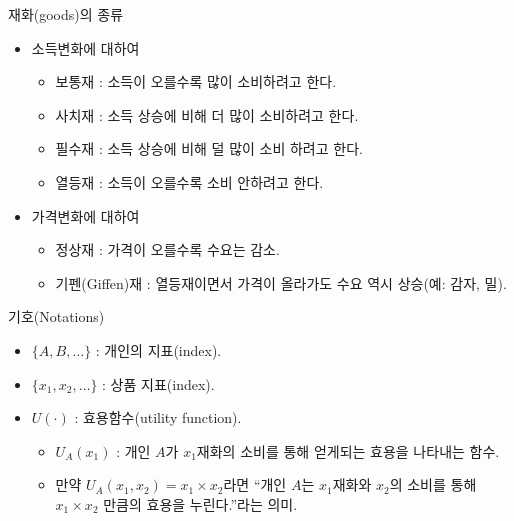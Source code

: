 \documentclass[aspectratio=169,xcolor=dvipsnames,handout]{beamer}
\begin{document}
\begin{frame}{재화(goods)의 종류}
    \begin{itemize}
        \item  소득변화에 대하여
        \begin{itemize}
            \item 보통재 : 소득이 오를수록 많이 소비하려고 한다.
            \item 사치재 : 소득 상승에 비해 더 많이 소비하려고 한다.
            \item 필수재 : 소득 상승에 비해 덜 많이 소비 하려고 한다.
            \item 열등재 : 소득이 오를수록 소비 안하려고 한다.
        \end{itemize}
        \item  가격변화에 대하여
        \begin{itemize}
            \item 정상재 : 가격이 오를수록 수요는 감소.
            \item 기펜(Giffen)재 : 열등재이면서 가격이 올라가도 수요 역시 상승(예: 감자, 밀).
        \end{itemize}
    \end{itemize}
\end{frame}

\begin{frame}{기호(Notations)}
    \begin{itemize}
        \item $\{A,B,\ldots\}$ : 개인의 지표(index).
        \item $\{x_1,x_2,\ldots\}$ : 상품 지표(index).
        \item $U(\cdot)$ : 효용함수(utility function).
        \begin{itemize}
            \item $U_A(x_1)$ : 개인 $A$가 $x_1$재화의 소비를 통해 얻게되는 효용을 나타내는 함수.
            \item 만약 $U_A(x_1,x_2) = x_1 \times x_2$라면 ``개인 $A$는 $x_1$재화와 $x_2$의 소비를 통해 $x_1 \times x_2$ 만큼의 효용을 누린다.''라는 의미.
        \end{itemize}
    \end{itemize}
\end{frame}
\end{document}
